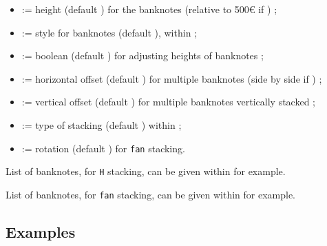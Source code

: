 \documentclass[11pt,a4paper]{ltxdoc}
\begin{document}
\begin{itemize}
	\item {} := height (default \MontreCode{2cm}) for the banknotes (relative to 500€ if ) ;
	\item {} := style for banknotes (default ), within  ;
	\item {} := boolean (default ) for adjusting heights of banknotes ;
	\item {} := horizontal offset (default \MontreCode{0pt}) for multiple banknotes (side by side if \MontreCode{0pt}) ;
	\item {} := vertical offset (default \MontreCode{5mm}) for multiple banknotes vertically stacked ;
	\item {} := type of stacking (default ) within  ;
	\item {} := rotation (default ) for \texttt{fan} stacking.
\end{itemize}

List of banknotes, for \texttt{H} stacking, can be given within  for example.

List of banknotes, for \texttt{fan} stacking, can be given within  for example.

\subsection{Examples}

\begin{DemoCode}{}
\\
\end{DemoCode}

\begin{DemoCode}{}
\end{DemoCode}

\begin{DemoCode}{}
\end{DemoCode}
\end{document}
